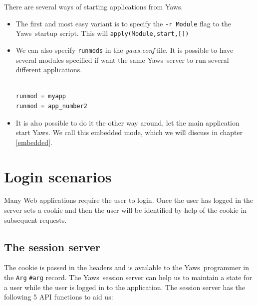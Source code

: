 \documentclass[11pt,oneside,english]{book}
\newcommand{\Yaws}            %
        {{\sc Yaws}}
\begin{document}
There are several ways of starting applications from \Yaws{}.

\begin{itemize}
\item The first and most easy variant is to specify the
  \verb+-r Module+ flag to the \Yaws\ startup script.  This will
  \verb+apply(Module,start,[])+

\item We can also specify \verb+runmods+ in the \textit{yaws.conf}
  file.  It is possible to have several modules specified if want the
  same \Yaws\ server to run several different applications.

\begin{verbatim}

runmod = myapp
runmod = app_number2

\end{verbatim}

\item It is also possible to do it the other way around, let the main
  application start \Yaws{}. We call this embedded mode, which we will
  discuss in chapter \ref{embedded}.

\end{itemize}



\section{Login scenarios}

Many Web applications require the user to login. Once the user has
logged in the server sets a cookie and then the user will be
identified by help of the cookie in subsequent requests.

\subsection{The session server}
The cookie is passed in the headers and is available to the
\Yaws\ programmer in the \verb+Arg+ \verb+#arg+ record. The
\Yaws\ session server can help us to maintain a state for a user while
the user is logged in to the application. The session server has the
following 5 API functions to aid us:
\end{document}
